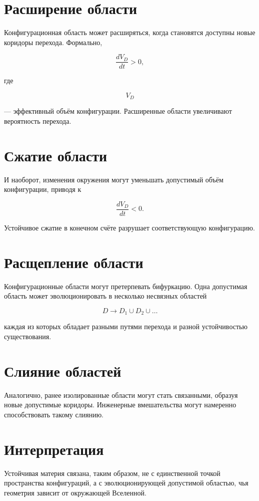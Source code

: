 \section{Расширение области}

Конфигурационная область может расширяться, когда становятся доступны новые коридоры перехода. Формально,

\[ \frac{dV_D}{dt}>0, \]

где

\[ V_D \]

— эффективный объём конфигурации. Расширенные области увеличивают вероятность перехода.

\section{Сжатие области}

И наоборот, изменения окружения могут уменьшать допустимый объём конфигурации, приводя к

\[ \frac{dV_D}{dt}<0. \]

Устойчивое сжатие в конечном счёте разрушает соответствующую конфигурацию.

\section{Расщепление области}

Конфигурационные области могут претерпевать бифуркацию. Одна допустимая область может эволюционировать в несколько несвязных областей

\[ D \rightarrow D_1 \cup D_2 \cup \dots \]

каждая из которых обладает разными путями перехода и разной устойчивостью существования.

\section{Слияние областей}

Аналогично, ранее изолированные области могут стать связанными, образуя новые допустимые коридоры. Инженерные вмешательства могут намеренно способствовать такому слиянию.

\section{Интерпретация}

Устойчивая материя связана, таким образом, не с единственной точкой пространства конфигураций, а с эволюционирующей допустимой областью, чья геометрия зависит от окружающей Вселенной.

